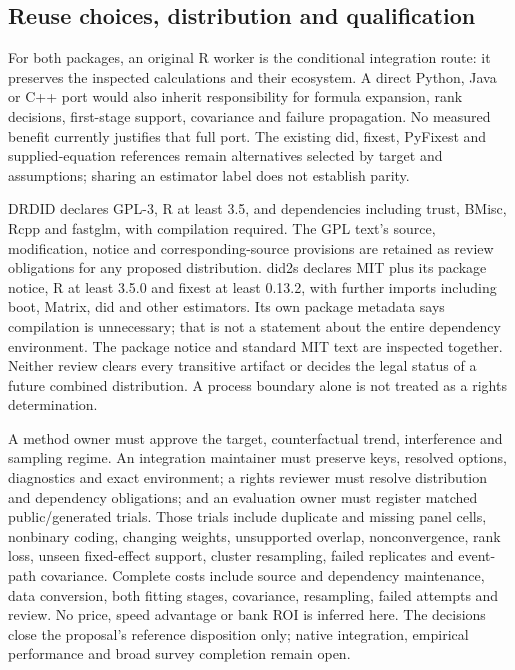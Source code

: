 \subsection{Reuse choices, distribution and qualification}
For both packages, an original R worker is the conditional integration route:
it preserves the inspected calculations and their ecosystem. A direct Python,
Java or C++ port would also inherit responsibility for formula expansion,
rank decisions, first-stage support, covariance and failure propagation. No
measured benefit currently justifies that full port. The existing did,
fixest, PyFixest and supplied-equation references remain alternatives selected
by target and assumptions; sharing an estimator label does not establish parity.
\citep{exec24_drdid_reuse_source,exec24_did2s_reuse_source,v12_sw_drdid,v12_sw_did2s}

DRDID declares GPL-3, R at least 3.5, and dependencies including trust, BMisc,
Rcpp and fastglm, with compilation required. The GPL text's source,
modification, notice and corresponding-source provisions are retained as
review obligations for any proposed distribution. did2s declares MIT plus its
package notice, R at least 3.5.0 and fixest at least 0.13.2, with further
imports including boot, Matrix, did and other estimators. Its own package
metadata says compilation is unnecessary; that is not a statement about the
entire dependency environment. The package notice and standard MIT text are
inspected together. Neither review clears every transitive artifact or decides
the legal status of a future combined distribution. A process boundary alone
is not treated as a rights determination.~\citep{exec24_drdid_reuse_source,exec24_did2s_reuse_source}

A method owner must approve the target, counterfactual trend, interference and
sampling regime. An integration maintainer must preserve keys, resolved
options, diagnostics and exact environment; a rights reviewer must resolve
distribution and dependency obligations; and an evaluation owner must register
matched public/generated trials. Those trials include duplicate and missing
panel cells, nonbinary coding, changing weights, unsupported overlap,
nonconvergence, rank loss, unseen fixed-effect support, cluster resampling,
failed replicates and event-path covariance. Complete costs include source
and dependency maintenance, data conversion, both fitting stages, covariance,
resampling, failed attempts and review. No price, speed advantage or bank ROI
is inferred here. The decisions close the proposal's reference disposition
only; native integration, empirical performance and broad survey completion
remain open.~\citep{exec24_drdid_reuse_source,exec24_did2s_reuse_source}


